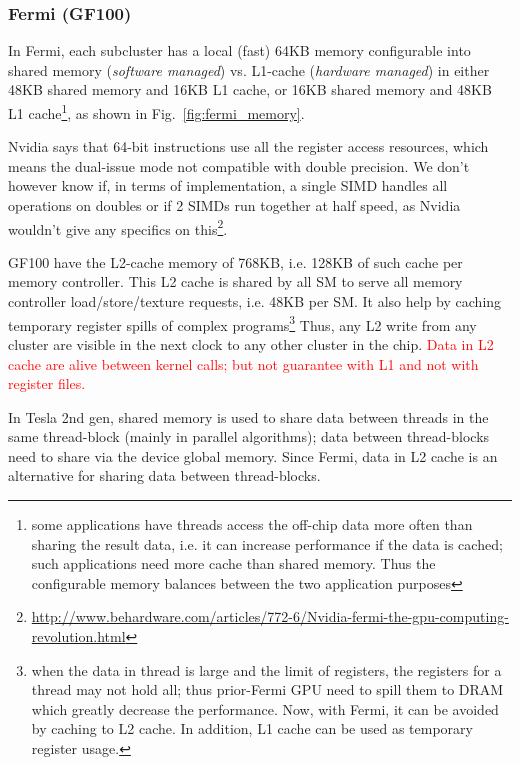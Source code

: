 \subsubsection{Fermi (GF100)}
\label{sec:fermi-gf100}

In Fermi, each subcluster has a local (fast) 64KB memory configurable
into shared memory ({\it software managed}) vs. L1-cache
({\it hardware managed}) in either 48KB shared memory and 16KB L1
cache, or 16KB shared memory and 48KB L1
cache\footnote{some applications have threads access the off-chip data
  more often than sharing the result data, i.e. it can increase
  performance if the data is cached; such applications need more cache
  than shared memory. Thus the configurable memory balances between
  the two application purposes},
as shown in Fig.~\ref{fig:fermi_memory}.

\begin{framed}
  Nvidia says that 64-bit instructions use all the register access
  resources, which means the dual-issue mode not compatible with double
  precision. We don't however know if, in terms of implementation, a
  single SIMD handles all operations on doubles or if 2 SIMDs run
  together at half speed, as Nvidia wouldn't give any specifics on
  this\footnote{\url{http://www.behardware.com/articles/772-6/Nvidia-fermi-the-gpu-computing-revolution.html}}.
\end{framed}

GF100 have the L2-cache memory of 768KB, i.e.  128KB of such cache per
memory controller.  This L2 cache is shared by all SM to serve all
memory controller load/store/texture requests, i.e. 48KB per SM. It
also help by caching temporary register spills of complex
programs\footnote{when the data in thread is large and the limit of
  registers, the registers for a thread may not hold all; thus
  prior-Fermi GPU need to spill them to DRAM which greatly decrease
  the performance. Now, with Fermi, it can be avoided by caching to L2
  cache. In addition, L1 cache can be used as temporary register
  usage.}
Thus, any L2 write from any cluster are visible in the next clock to
any other cluster in the chip.
\textcolor{red}{Data in L2 cache are alive between kernel calls; but
  not guarantee with L1 and not with register files.}

\begin{framed}
  In Tesla 2nd gen, shared memory is used to share data between
  threads in the same thread-block (mainly in parallel algorithms);
  data between thread-blocks need to share via the device global
  memory. Since Fermi, data in L2 cache is an alternative for sharing
  data between thread-blocks.
\end{framed}

